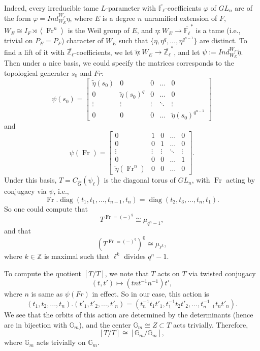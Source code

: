 \documentclass{article}
\newcommand{\diag}{\operatorname{diag}}
\newcommand{\Fr}{\operatorname{Fr}}
\begin{document}
Indeed, every irreducible tame $L$-parameter with $\overline{\mathbb{F}_{\ell}}$-coefficients $\varphi$ of $GL_n$ are of the form $\varphi=Ind_{W_E}^{W_F}\eta$, where $E$ is a degree $n$ unramified extension of $F$, $W_E \cong I_F \rtimes \left<\Fr^n\right>$ is the Weil group of $E$, and $\eta: W_E \to \overline{\mathbb{F}_{\ell}}^*$ is a tame (i.e., trivial on $P_E=P_F$) character of $W_E$ such that $\{\eta, \eta^q, ..., \eta^{q^{n-1}}\}$ are distinct. To find a lift of it with $\overline{\mathbb{Z}_{\ell}}$-coefficients, we let $\tilde{\eta}: W_E \to \overline{\mathbb{Z}_{\ell}}^*$, and let $\psi:=Ind_{W_E}^{W_F}\tilde{\eta}$. Then under a nice basis, we could specify the matrices corresponds to the topological generater $s_0$ and $Fr$:
$$\psi(s_0)=
\begin{bmatrix}
	\tilde{\eta}(s_0) & 0                   & 0      & \dots  & 0 \\
	0                 & \tilde{\eta}(s_0)^q & 0      & \dots  & 0 \\
	\vdots            & \vdots              & \vdots & \ddots & \vdots \\
	0                 & 0                   & 0      & \dots   & \tilde{\eta}(s_0)^{q^{n-1}}
\end{bmatrix}$$
and 
$$\psi(\Fr)=
\begin{bmatrix}
	0                   & 1      & 0      & \dots  & 0 \\
	0                   & 0      & 1      & \dots  & 0 \\
	\vdots              & \vdots & \vdots & \ddots & \vdots \\
	0                   & 0      & 0      & \dots  & 1 \\
	\tilde{\eta}(\Fr^n) & 0      & 0      & \dots  & 0
\end{bmatrix}
.$$
Under this basis, $T=C_{\hat{G}}(\psi_{\ell})$ is the diagonal torus of $GL_n$, with $\Fr$ acting by conjugacy via $\psi$, i.e., 
$$\Fr. \diag(t_1, t_1, ..., t_{n-1}, t_{n}) = \diag(t_{2}, t_{3}, ..., t_{n}, t_{1}).$$
So one could compute that 
$$T^{\Fr=(-)^q}\cong \mu_{q^n-1},$$
and that
$$(T^{\Fr=(-)^q})^0 \cong \mu_{\ell^k},$$
where $k \in \mathbb{Z}$ is maximal such that $\ell^k$ divides $q^n-1$.

To compute the quotient $[T/T]$, we note that $T$ acts on $T$ via twisted conjugacy
$$(t, t') \mapsto (tnt^{-1}n^{-1})t',$$
where $n$ is same as $\psi(Fr)$ in effect. So in our case, this action is 
$$(t_1, t_2, ..., t_n).(t'_1, t'_2, ..., t'_n)=(t_n^{-1}t_1t'_1, t_1^{-1}t_2t'_2, ..., t_{n-1}^{-1}t_nt'_n).$$ 
We see that the orbits of this action are determined by the determinants (hence are in bijection with $\mathbb{G}_m$), and the center $\mathbb{G}_m \cong Z \subset T$ acts trivially. Therefore,
$$[T/T] \cong [\mathbb{G}_m/\mathbb{G}_m],$$
where $\mathbb{G}_m$ acts trivially on $\mathbb{G}_m$.
\end{document}
